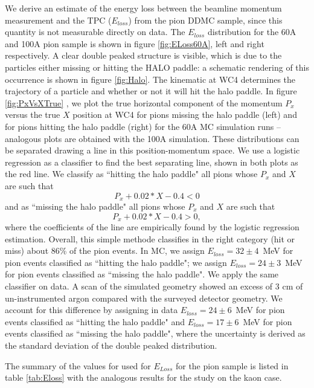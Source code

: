 We derive an estimate of the energy loss between the beamline momentum measurement and the TPC ($E_{loss}$) from the pion DDMC sample, since this quantity is not  measurable directly on data. 
The $E_{loss}$ distribution for the 60A  and 100A pion sample is shown in figure \ref{fig:ELoss60A}, left and right respectively. A clear double peaked structure is visible, which is due to the particles either missing or hitting the HALO paddle: a schematic rendering of this occurrence is  shown in figure \ref{fig:Halo}. The kinematic at WC4 determines the trajectory of a particle and whether or not it will hit the halo paddle. In figure \ref{fig:PxVsXTrue} , we plot the true  horizontal component of the momentum $P_x$ versus the true $X$ position at WC4 for pions missing the halo paddle (left) and for pions hitting the halo paddle (right) for the 60A MC simulation runs -- analogous plots are obtained with the 100A simulation. These distributions can be separated drawing a line in this position-momentum space. 
We use a logistic regression  \cite{agresti2013categorical}  as a classifier to find the best separating line, shown in both plots as the red line. We classify as ``hitting the halo paddle" all pions whose $P_x$ and $X$ are such that $$P_x +0.02* X - 0.4 < 0 $$ and as ``missing the halo  paddle" all pions whose $P_x$ and $X$ are such that $$P_x +0.02*X - 0.4 > 0, $$ where the coefficients of the line are empirically found by the logistic regression estimation. Overall, this simple methode classifies in the right category (hit or miss) about 86\% of the pion events. In MC, we assign  $E_{loss} = 32 \pm 4 $~MeV for pion events classified as ``hitting the halo paddle"; we assign  $E_{loss} = 24 \pm 3 $~MeV for pion events classified as ``missing the halo paddle". We apply the same classifier on data. A scan of the simulated geometry showed an excess of 3 cm of un-instrumented argon compared with the surveyed detector geometry. We account for this difference by assigning in data $E_{loss} = 24 \pm 6 $~MeV for pion events classified as ``hitting the halo paddle" and  $E_{loss} = 17 \pm 6 $~MeV for pion events classified as ``missing the halo paddle", where the uncertainty is derived as the standard deviation of the double peaked distribution.

The summary of the values for used for $E_{Loss}$ for the pion sample is listed in table \ref{tab:Eloss}  with the analogous results for the study on the kaon case.

